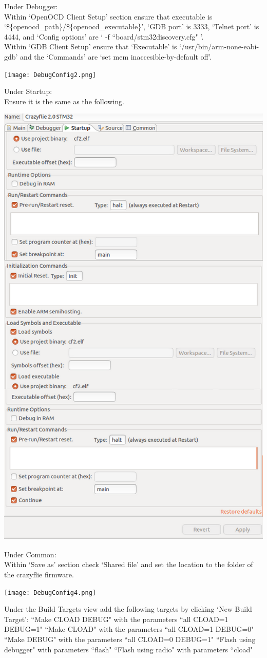 \documentclass[]{article}
\begin{document}
Under Debugger: \\
Within `OpenOCD Client Setup' section ensure that executable is `\$\{openocd\_path\}/\$\{openocd\_executable\}', `GDB port' is 3333, `Telnet port' is 4444, and `Config options' are ` -f ``board/stm32discovery.cfg" '. \\
Within `GDB Client Setup' ensure that `Executable' is `/usr/bin/arm-none-eabi-gdb' and the `Commands' are `set mem inaccesible-by-default off'.

\texttt{[image: DebugConfig2.png]}

Under Startup: \\
Ensure it is the same as the following.

\includegraphics[width=0.55\linewidth]{DebugConfig3.png}

\newpage

Under Common: \\
Within `Save as' section check `Shared file' and set the location to the folder of the crazyflie firmware.

\texttt{[image: DebugConfig4.png]}

Under the Build Targets view add the following targets by clicking `New Build Target':
``Make CLOAD DEBUG" with the parameters ``all CLOAD=1 DEBUG=1"
``Make CLOAD" with the parameters ``all CLOAD=1 DEBUG=0"
``Make DEBUG" with the parameters ``all CLOAD=0 DEBUG=1"
``Flash using debugger" with parameters ``flash"
``Flash using radio" with parameters ``cload"
\end{document}
